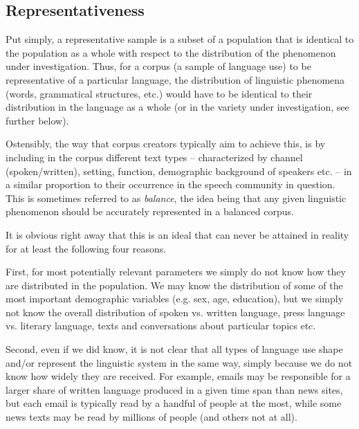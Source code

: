 \subsection{Representativeness}
\label{sec:representativeness}

Put simply, a representative sample is a subset of a population that is identical to the population as a whole with respect to the distribution of the phenomenon under investigation. Thus, for a corpus (a sample of language use) to be representative of a particular language, the distribution of linguistic phenomena (words, grammatical structures, etc.) would have to be identical to their distribution in the language as a whole (or in the variety under investigation, see further below).

Ostensibly, the way that corpus creators typically aim to achieve this, is by including in the corpus different text types -- characterized by channel (spoken/written), setting, function, demographic background of speakers etc. -- in a similar proportion to their occurrence in the speech community in question. This is sometimes referred to as \emph{balance}, the idea being that any given linguistic phenomenon should be accurately represented in a balanced corpus.

It is obvious right away that this is an ideal that can never be attained in reality for at least the following four reasons.

First, for most potentially relevant parameters we simply do not know how they are distributed in the population. We may know the distribution of some of the most important demographic variables (e.g. sex, age, education), but we simply not know the overall distribution of spoken vs. written language, press language vs. literary language, texts and conversations about particular topics etc.

Second, even if we did know, it is not clear that all types of language use shape and/or represent the linguistic system in the same way, simply because we do not know how widely they are received. For example, emails may be responsible for a larger share of written language produced in a given time span than news sites, but each email is typically read by a handful of people at the most, while some news texts may be read by millions of people (and others not at all).

